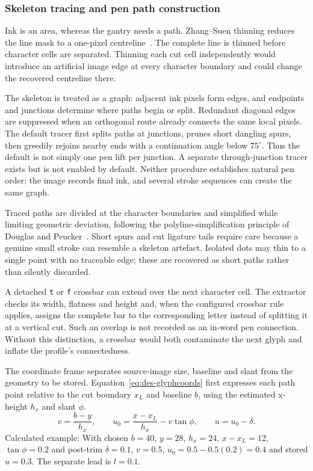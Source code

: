 \subsubsection{Skeleton tracing and pen path construction}
Ink is an area, whereas the gantry needs a path. Zhang--Suen thinning reduces the line mask to a one-pixel centreline~\cite[p.~237]{zhang1984}. The complete line is thinned before character cells are separated. Thinning each cut cell independently would introduce an artificial image edge at every character boundary and could change the recovered centreline there.

The skeleton is treated as a graph: adjacent ink pixels form edges, and endpoints and junctions determine where paths begin or split. Redundant diagonal edges are suppressed when an orthogonal route already connects the same local pixels. The default tracer first splits paths at junctions, prunes short dangling spurs, then greedily rejoins nearby ends with a continuation angle below $75^\circ$. Thus the default is not simply one pen lift per junction. A separate through-junction tracer exists but is not enabled by default. Neither procedure establishes natural pen order: the image records final ink, and several stroke sequences can create the same graph.~\cite[style.py; synthesise.py; reproduce.py]{braunepipeline2026}

Traced paths are divided at the character boundaries and simplified while limiting geometric deviation, following the polyline-simplification principle of Douglas and Peucker~\cite[page to verify]{douglas1973}. Short spurs and cut ligature tails require care because a genuine small stroke can resemble a skeleton artefact. Isolated dots may thin to a single point with no traceable edge; these are recovered as short paths rather than silently discarded.~\cite[style.py; synthesise.py; reproduce.py]{braunepipeline2026}

A detached \texttt{t} or \texttt{f} crossbar can extend over the next character cell. The extractor checks its width, flatness and height and, when the configured crossbar rule applies, assigns the complete bar to the corresponding letter instead of splitting it at a vertical cut. Such an overlap is not recorded as an in-word pen connection. Without this distinction, a crossbar would both contaminate the next glyph and inflate the profile's connectedness.~\cite[project records; implementation]{brauneevidence2026,braunepipeline2026}

The coordinate frame separates source-image size, baseline and slant from the geometry to be stored. Equation~\ref{eq:des-glyphcoords} first expresses each path point relative to the cut boundary $x_L$ and baseline $b$, using the estimated x-height $h_x$ and slant $\phi$.
\begin{equation}
v=\frac{b-y}{h_x},\qquad
u_0=\frac{x-x_L}{h_x}-v\tan\phi,\qquad u=u_0-\delta.
\label{eq:des-glyphcoords}
\end{equation}
Calculated example: With chosen $b=40$, $y=28$, $h_x=24$, $x-x_L=12$, $\tan\phi=0.2$ and post-trim $\delta=0.1$, $v=0.5$, $u_0=0.5-0.5(0.2)=0.4$ and stored $u=0.3$. The separate lead is $l=0.1$. \cite[style.py, ExtractLineGlyphs]{braunepipeline2026}

